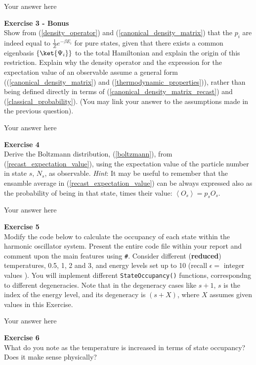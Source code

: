 \documentclass{article}
\begin{document}
Your answer here

\begin{mdframed}
\textbf{Exercise 3 - Bonus}\\
Show from (\ref{density_operator}) and (\ref{canonical_density_matrix}) that the $p_i$ are indeed equal to $\frac{1}{Z}e^{ -\beta E_i}$ for pure states, given that there exists a common eigenbasis $\left\{\ket{\Psi_i}\right\}$ to the total Hamiltonian and explain the origin of this restriction.
Explain why the density operator and the expression for the expectation value of an observable assume a general form ((\ref{canonical_density_matrix}) and (\ref{thermodynamic_properties})), rather than being defined directly in terms of (\ref{canonical_density_matrix_recast}) and (\ref{classical_probability}).
(You may link your answer to the assumptions made in the previous question).
\end{mdframed}

Your answer here

\begin{mdframed}
\textbf{Exercise 4}\\
Derive the Boltzmann distribution, (\ref{boltzmann}), from (\ref{recast_expectation_value}), using the   expectation value of the particle number in state $s$, $N_s$, as observable.
\textit{Hint}: It may be useful to remember that the ensamble average in (\ref{recast_expectation_value}) can be always expressed also as the probability of being in that state, times their value: $\left< O_s \right> = p_s O_s$.
\end{mdframed}

Your answer here

\begin{mdframed}
\textbf{Exercise 5}\\
Modify the code below to calculate the occupancy of each state within the harmonic oscillator system.
Present the entire code file within your report and comment upon the main features using \texttt{\#}.
Consider different (\textbf{reduced}) temperatures, 0.5, 1, 2 and 3, and energy levels set up to 10 (recall $\epsilon =$ integer values ).
You will implement different \texttt{StateOccupancy()} functions, correspondng to different degeneracies. Note that in the degeneracy cases like $s+1$, $s$ is
the index of the energy level, and its degeneracy is $(s + X)$, where $X$ assumes given values in this Exercise.
\end{mdframed}

Your answer here

\begin{mdframed}
\textbf{Exercise 6}\\
What do you note as the temperature is increased in terms of state occupancy? Does it make sense physically?
\end{mdframed}
\end{document}
